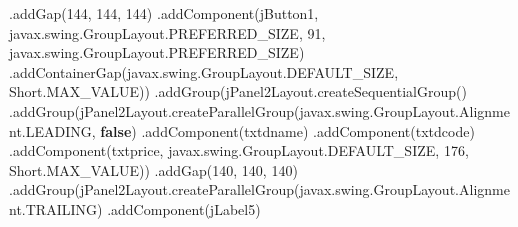 \documentclass[
  10pt,
]{article}
\newenvironment{Shaded}{}{}
\newcommand{\BuiltInTok}[1]{\textcolor[rgb]{0.00,0.50,0.00}{#1}}
\newcommand{\DecValTok}[1]{\textcolor[rgb]{0.25,0.63,0.44}{#1}}
\newcommand{\FunctionTok}[1]{\textcolor[rgb]{0.02,0.16,0.49}{#1}}
\newcommand{\KeywordTok}[1]{\textcolor[rgb]{0.00,0.44,0.13}{\textbf{#1}}}
\newcommand{\NormalTok}[1]{#1}
\newcommand{\OperatorTok}[1]{\textcolor[rgb]{0.40,0.40,0.40}{#1}}
\begin{document}
\begin{Shaded}
\begin{Highlighting}[numbers=left,,]
                        \OperatorTok{.}\FunctionTok{addGap}\OperatorTok{(}\DecValTok{144}\OperatorTok{,} \DecValTok{144}\OperatorTok{,} \DecValTok{144}\OperatorTok{)}
                        \OperatorTok{.}\FunctionTok{addComponent}\OperatorTok{(}\NormalTok{jButton1}\OperatorTok{,}\NormalTok{ javax}\OperatorTok{.}\FunctionTok{swing}\OperatorTok{.}\FunctionTok{GroupLayout}\OperatorTok{.}\FunctionTok{PREFERRED\_SIZE}\OperatorTok{,} \DecValTok{91}\OperatorTok{,}\NormalTok{ javax}\OperatorTok{.}\FunctionTok{swing}\OperatorTok{.}\FunctionTok{GroupLayout}\OperatorTok{.}\FunctionTok{PREFERRED\_SIZE}\OperatorTok{)}
                        \OperatorTok{.}\FunctionTok{addContainerGap}\OperatorTok{(}\NormalTok{javax}\OperatorTok{.}\FunctionTok{swing}\OperatorTok{.}\FunctionTok{GroupLayout}\OperatorTok{.}\FunctionTok{DEFAULT\_SIZE}\OperatorTok{,} \BuiltInTok{Short}\OperatorTok{.}\FunctionTok{MAX\_VALUE}\OperatorTok{))}
                    \OperatorTok{.}\FunctionTok{addGroup}\OperatorTok{(}\NormalTok{jPanel2Layout}\OperatorTok{.}\FunctionTok{createSequentialGroup}\OperatorTok{()}
                        \OperatorTok{.}\FunctionTok{addGroup}\OperatorTok{(}\NormalTok{jPanel2Layout}\OperatorTok{.}\FunctionTok{createParallelGroup}\OperatorTok{(}\NormalTok{javax}\OperatorTok{.}\FunctionTok{swing}\OperatorTok{.}\FunctionTok{GroupLayout}\OperatorTok{.}\FunctionTok{Alignment}\OperatorTok{.}\FunctionTok{LEADING}\OperatorTok{,} \KeywordTok{false}\OperatorTok{)}
                            \OperatorTok{.}\FunctionTok{addComponent}\OperatorTok{(}\NormalTok{txtdname}\OperatorTok{)}
                            \OperatorTok{.}\FunctionTok{addComponent}\OperatorTok{(}\NormalTok{txtdcode}\OperatorTok{)}
                            \OperatorTok{.}\FunctionTok{addComponent}\OperatorTok{(}\NormalTok{txtprice}\OperatorTok{,}\NormalTok{ javax}\OperatorTok{.}\FunctionTok{swing}\OperatorTok{.}\FunctionTok{GroupLayout}\OperatorTok{.}\FunctionTok{DEFAULT\_SIZE}\OperatorTok{,} \DecValTok{176}\OperatorTok{,} \BuiltInTok{Short}\OperatorTok{.}\FunctionTok{MAX\_VALUE}\OperatorTok{))}
                        \OperatorTok{.}\FunctionTok{addGap}\OperatorTok{(}\DecValTok{140}\OperatorTok{,} \DecValTok{140}\OperatorTok{,} \DecValTok{140}\OperatorTok{)}
                        \OperatorTok{.}\FunctionTok{addGroup}\OperatorTok{(}\NormalTok{jPanel2Layout}\OperatorTok{.}\FunctionTok{createParallelGroup}\OperatorTok{(}\NormalTok{javax}\OperatorTok{.}\FunctionTok{swing}\OperatorTok{.}\FunctionTok{GroupLayout}\OperatorTok{.}\FunctionTok{Alignment}\OperatorTok{.}\FunctionTok{TRAILING}\OperatorTok{)}
                            \OperatorTok{.}\FunctionTok{addComponent}\OperatorTok{(}\NormalTok{jLabel5}\OperatorTok{)}

\end{Highlighting}
\end{Shaded}
\end{document}
